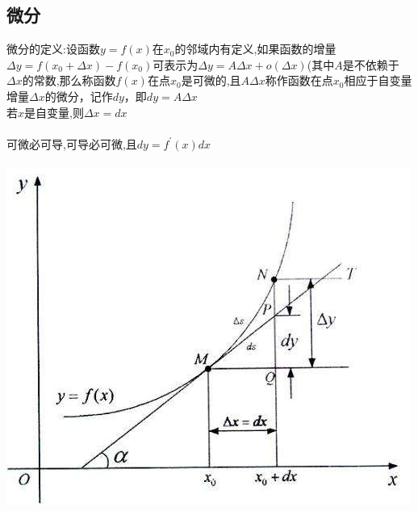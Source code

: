 \documentclass{article}
\begin{document}
\begin{flushleft}
	\subsection{微分}
	
	微分的定义:设函数$y=f(x)$在$x_0$的邻域内有定义,如果函数的增量$\Delta y = f(x_0 + \Delta x) − f(x_0)$可表示为$ \Delta y = A\Delta x + o(\Delta x)$(其中$A$是不依赖于$\Delta x$的常数,那么称函数$f(x)$在点$x_0$是可微的,且$A\Delta x$称作函数在点$x_0$相应于自变量增量$\Delta x$的微分，记作$dy$，即$dy = A\Delta x$\\
	若$x$是自变量,则$\Delta x=dx$\\
	~\\
	可微必可导,可导必可微,且$dy=f^{'}(x)dx$\\
	~\\
	\includegraphics[scale=1.0]{1.jpg}
	
\end{flushleft}
\end{document}
